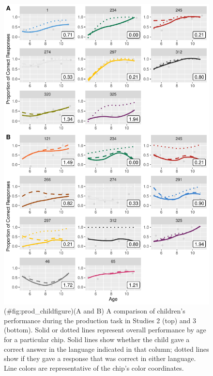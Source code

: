 \documentclass[
  english,
  ,man,floatsintext]{apa6}
\begin{document}
\begin{figure}
\centering
\includegraphics{amazon_color_files/figure-latex/prod_childfigure-1.pdf}
\caption{(\#fig:prod\_childfigure)(A and B) A comparison of children's performance during the production task in Studies 2 (top) and 3 (bottom). Solid or dotted lines represent overall performance by age for a particular chip. Solid lines show whether the child gave a correct answer in the language indicated in that column; dotted lines show if they gave a response that was correct in either language. Line colors are representative of the chip's color coordinates.}
\end{figure}
\end{document}
